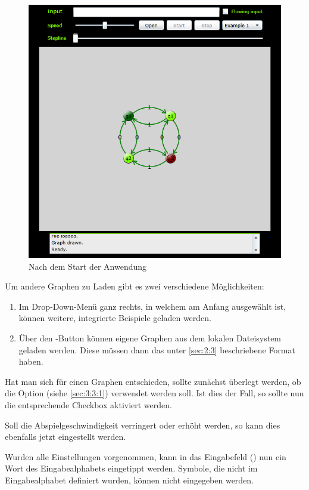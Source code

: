 \begin{figure}[H]
	\centering
	\includegraphics[scale=0.65]{gui.png}
	\caption{\label{fig:gui} Nach dem Start der Anwendung}
\end{figure}

Um andere Graphen zu Laden gibt es zwei verschiedene Möglichkeiten:
\begin{enumerate}
	\item Im Drop-Down-Menü ganz rechts, in welchem am Anfang 
		ausgewählt ist, können weitere, integrierte Beispiele geladen werden.

	\item Über den -Button können eigene Graphen aus dem lokalen Dateisystem
		geladen werden. Diese müssen dann das unter \ref{sec:2:3} beschriebene Format haben.
\end{enumerate}

Hat man sich für einen Graphen entschieden, sollte zunächst überlegt werden, ob
die Option  (siehe \ref{sec:3:3:1}) verwendet werden soll. Ist dies der
Fall, so sollte nun die entsprechende Checkbox aktiviert werden.

Soll die Abspielgeschwindigkeit verringert oder erhöht werden, so kann dies
ebenfalls jetzt eingestellt werden.

Wurden alle Einstellungen vorgenommen, kann in das Eingabefeld () nun
ein Wort des Eingabealphabets eingetippt werden. Symbole, die nicht im
Eingabealphabet definiert wurden, können nicht eingegeben werden.

